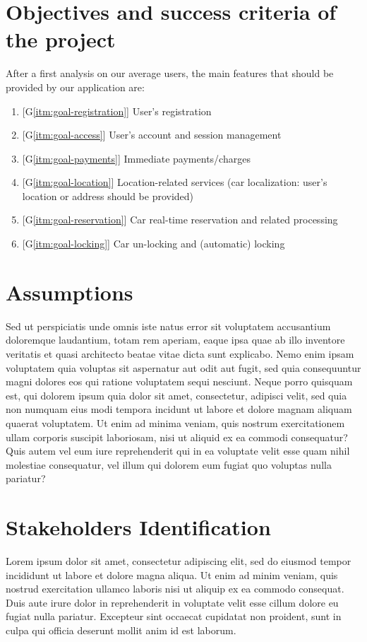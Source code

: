 \section{Objectives and success criteria of the project}
After a first analysis on our average users, the main features that should be provided by our application are:
\begin{enumerate}
	\item{[G\ref{itm:goal-registration}] User's registration}\label{itm:goal-registration}
	\item{[G\ref{itm:goal-access}] User's account and session management}\label{itm:goal-access}
	\item{[G\ref{itm:goal-payments}] Immediate payments/charges}\label{itm:goal-payments}
	\item{[G\ref{itm:goal-location}] Location-related services (car localization: user's location or address should be provided)}\label{itm:goal-location}
	\item{[G\ref{itm:goal-reservation}] Car real-time reservation and related processing}\label{itm:goal-reservation}
	\item{[G\ref{itm:goal-locking}] Car un-locking and (automatic) locking}\label{itm:goal-locking}
\end{enumerate}
\section{Assumptions}
Sed ut perspiciatis unde omnis iste natus error sit voluptatem accusantium doloremque laudantium, totam rem aperiam, 
eaque ipsa quae ab illo inventore veritatis et quasi architecto beatae vitae dicta sunt explicabo. 
Nemo enim ipsam voluptatem quia voluptas sit aspernatur aut odit aut fugit, sed quia consequuntur magni 
dolores eos qui ratione voluptatem sequi nesciunt. Neque porro quisquam est, qui dolorem ipsum quia dolor sit amet, 
consectetur, adipisci velit, sed quia non numquam eius modi tempora incidunt ut labore et dolore magnam aliquam quaerat voluptatem. 
Ut enim ad minima veniam, quis nostrum exercitationem ullam corporis suscipit laboriosam, nisi ut aliquid ex ea commodi consequatur? 
Quis autem vel eum iure reprehenderit qui in ea voluptate velit esse quam nihil molestiae consequatur, 
vel illum qui dolorem eum fugiat quo voluptas nulla pariatur?
\section{Stakeholders Identification}
Lorem ipsum dolor sit amet, consectetur adipiscing elit, sed do eiusmod tempor incididunt ut labore et dolore magna aliqua. 
Ut enim ad minim veniam, quis nostrud exercitation ullamco laboris nisi ut aliquip ex ea commodo consequat. 
Duis aute irure dolor in reprehenderit in voluptate velit esse cillum dolore eu fugiat nulla pariatur. 
Excepteur sint occaecat cupidatat non proident, sunt in culpa qui officia deserunt mollit anim id est laborum.
